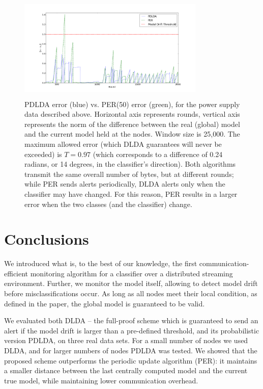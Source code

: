 \begin{figure}
\centering
	\includegraphics[width=3.5in,height=2in]{graphics/PDLADvsPERGas.png}
\caption{PDLDA error (blue) vs. PER(50) error (green), for the power supply
	data described above. Horizontal axis represents rounds, vertical
	axis represents the norm of the difference between the real (global) model and the current model held at the nodes. Window size is 25,000.
	The maximum allowed error (which DLDA guarantees will never be
	exceeded) is $T = 0.97$ (which corresponds to a difference of
	0.24 radians, or 14 degrees, in the classifier's direction). Both
	algorithms transmit the same overall number of bytes, but at different
	rounds; while PER sends alerts periodically, DLDA alerts only when the classifier may have changed. For this reason, PER results in a larger
	error when the two classes (and the classifier) change. }
\label{PDLADvsPERGas}
\end{figure}
%
%
\section*{Conclusions}
We introduced what is, to the best of our knowledge, the first communication-efficient monitoring algorithm for a classifier over a distributed streaming environment. 
Further, we monitor the
model itself, allowing to detect model drift before misclassifications occur.
As long as all nodes meet their local condition, as defined in
the paper, the
global model is guaranteed to be valid. 

%
We evaluated both DLDA -- the full-proof scheme which is guaranteed to send an
alert if the model drift is larger than a pre-defined threshold, and its probabilistic version PDLDA, on three real data sets.
For a small number of nodes we used DLDA, and for larger numbers of nodes 
PDLDA was tested. We showed that the proposed scheme outperforms the periodic update algorithm (PER): it maintains a smaller distance between
the last centrally computed model and the current true model, while maintaining 
lower communication overhead.

